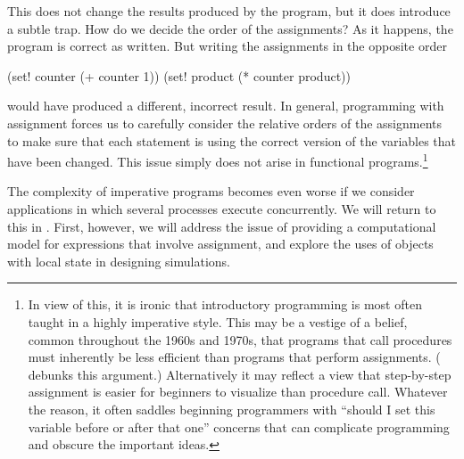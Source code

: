 \noindent
This does not change the results produced by the program, but it does introduce
a subtle trap.  How do we decide the order of the assignments?  As it happens,
the program is correct as written.  But writing the assignments in the opposite
order

\begin{codeBlock}
(set! counter (+ counter 1))
(set! product (* counter product))
\end{codeBlock}

\noindent
would have produced a different, incorrect result.  In general, programming
with assignment forces us to carefully consider the relative orders of the
assignments to make sure that each statement is using the correct version of
the variables that have been changed.  This issue simply does not arise in
functional programs.\footnote{In view of this, it is ironic that introductory
programming is most often taught in a highly imperative style.  This may be a
vestige of a belief, common throughout the 1960s and 1970s, that programs that
call procedures must inherently be less efficient than programs that perform
assignments.  ( debunks this argument.)  Alternatively it may
reflect a view that step-by-step assignment is easier for beginners to
visualize than procedure call.  Whatever the reason, it often saddles beginning
programmers with ``should I set this variable before or after that one''
concerns that can complicate programming and obscure the important ideas.}

The complexity of imperative programs becomes even worse if we consider
applications in which several processes execute concurrently.  We will return
to this in .  First, however, we will address the issue of
providing a computational model for expressions that involve assignment, and
explore the uses of objects with local state in designing simulations.


